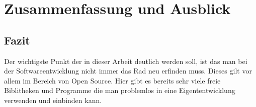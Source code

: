\chapter{Zusammenfassung und Ausblick} 
\section{Fazit}
Der wichtigste Punkt der in dieser Arbeit deutlich werden soll, ist das man bei der Softwareentwicklung nicht immer das Rad neu erfinden muss. Dieses gilt vor allem im Bereich von Open Source. Hier gibt es bereits sehr viele freie Biblitheken und Programme die man problemlos in eine Eigententwicklung verwenden und einbinden kann.